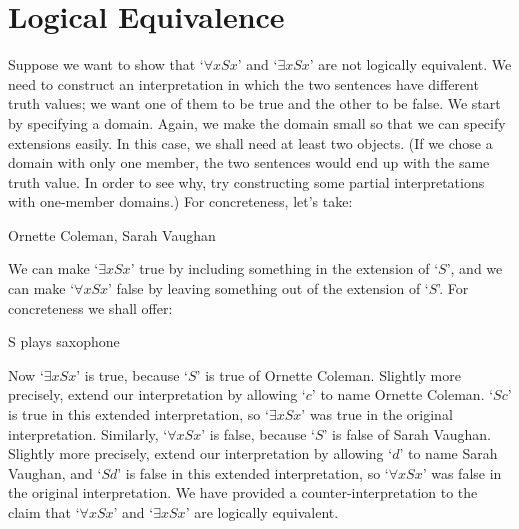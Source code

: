 \section{Logical Equivalence}
Suppose we want to show that `$\forall x Sx$' and `$\exists x Sx$' are not logically equivalent. We need to construct an interpretation in which the two sentences have different truth values; we want one of them to be true and the other to be false. We start by specifying a domain. Again, we make the domain small so that we can specify extensions easily. In this case, we shall need at least two objects. (If we chose a domain with only one member, the two sentences would end up with the same truth value. In order to see why, try constructing some partial interpretations with one-member domains.) For concreteness, let's take:
	\begin{ekey}
		\item[\domain] Ornette Coleman, Sarah Vaughan
	\end{ekey}
We can make `$\exists x Sx$' true by including something in the extension of `$S$', and we can make `$\forall x Sx$' false by leaving something out of the extension of `$S$'. For concreteness we shall offer:
	\begin{ekey}
		\item[S]  plays saxophone
	\end{ekey}
Now `$\exists x Sx$' is true, because `$S$' is true of Ornette Coleman. Slightly more precisely, extend our interpretation by allowing `$c$' to name Ornette Coleman.  `$Sc$' is true in this extended interpretation, so `$\exists x Sx$' was true in the original interpretation. Similarly, `$\forall x Sx$' is false, because `$S$' is false of Sarah Vaughan. Slightly more precisely, extend our interpretation by allowing `$d$' to name Sarah Vaughan, and `$Sd$' is false in this extended interpretation, so `$\forall x Sx$' was false in the original interpretation. We have provided a counter-interpretation to the claim that `$\forall x Sx$' and `$\exists x Sx$' are logically equivalent.

